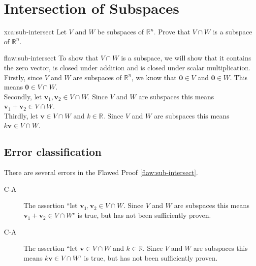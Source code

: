 \section{Intersection of Subspaces}

\begin{xca}{xca:sub-intersect}
Let $V$ and $W$ be subspaces of $\mathbb{R}^n$. Prove that $V \cap W$ is a subspace of $\mathbb{R}^n$.
\end{xca}

\begin{flaw}{flaw:sub-intersect} %
To show that $V\cap W$ is a subspace, we will show that it contains the zero vector, is closed under addition and is closed under scalar multiplication. \\

Firstly, since $V$ and $W$ are subspaces of $\mathbb{R}^n$, we know that $\bm{0} \in V$ and $\bm{0} \in W$. This means $\bm{0} \in V \cap W$. \\

Secondly, let $\bm{v}_1, \bm{v}_2 \in V \cap W$. Since $V$ and $W$ are subspaces this means $\bm{v}_1 + \bm{v}_2 \in V \cap W$. \\

Thirdly, let $\bm{v} \in V \cap W$ and $k \in \mathbb{R}$. Since $V$ and $W$ are subspaces this means $k\bm{v} \in V \cap W$. \\

\end{flaw}

\clearpage
\subsection{Error classification}


There are several errors
 in the Flawed Proof \ref{flaw:sub-intersect}.

 \begin{description}
    \item[C-A]  The assertion ``let $\bm{v}_1, \bm{v}_2 \in V \cap W$. Since $V$ and $W$ are subspaces this means $\bm{v}_1 + \bm{v}_2 \in V \cap W$" is true, but has not been sufficiently proven.
    \item[C-A] The assertion ``let $\bm{v} \in V \cap W$ and $k \in \mathbb{R}$. Since $V$ and $W$ are subspaces this means $k\bm{v} \in V \cap W$" is true, but has not been sufficiently proven.
 	
 \end{description}


